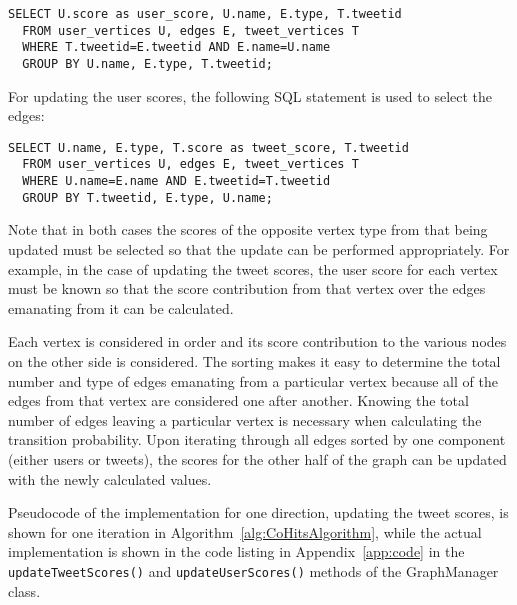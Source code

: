 \begin{verbatim}
SELECT U.score as user_score, U.name, E.type, T.tweetid
  FROM user_vertices U, edges E, tweet_vertices T
  WHERE T.tweetid=E.tweetid AND E.name=U.name
  GROUP BY U.name, E.type, T.tweetid;
\end{verbatim}

\noindent
For updating the user scores, the following SQL statement is used to select the edges:

\begin{verbatim}
SELECT U.name, E.type, T.score as tweet_score, T.tweetid
  FROM user_vertices U, edges E, tweet_vertices T
  WHERE U.name=E.name AND E.tweetid=T.tweetid
  GROUP BY T.tweetid, E.type, U.name;
\end{verbatim}

\noindent
Note that in both cases the scores of the opposite vertex type from that being updated must be selected so that the update can be performed appropriately. For example, in the case of updating the tweet scores, the user score for each vertex must be known so that the score contribution from that vertex over the edges emanating from it can be calculated.

Each vertex is considered in order and its score contribution to the various nodes on the other side is considered. The sorting makes it easy to determine the total number and type of edges emanating from a particular vertex because all of the edges from that vertex are considered one after another. Knowing the total number of edges leaving a particular vertex is necessary when calculating the transition probability. Upon iterating through all edges sorted by one component (either users or tweets), the scores for the other half of the graph can be updated with the newly calculated values.

Pseudocode of the implementation for one direction, updating the tweet scores, is shown for one iteration in Algorithm~\ref{alg:CoHitsAlgorithm}, while the actual implementation is shown in the code listing in Appendix~\ref{app:code} in the \texttt{updateTweetScores()} and \texttt{updateUserScores()} methods of the GraphManager class.

